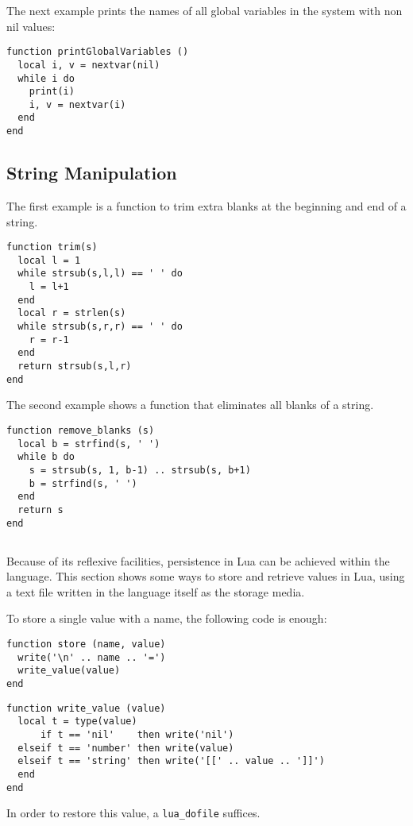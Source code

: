 The next example prints the names of all global variables
in the system with non nil values:
\begin{verbatim}
function printGlobalVariables ()
  local i, v = nextvar(nil)
  while i do
    print(i)
    i, v = nextvar(i)
  end
end
\end{verbatim}


\subsection{String Manipulation} \label{exstring}

The first example is a function to trim extra blanks at the beginning
and end of a string.
\begin{verbatim}
function trim(s)
  local l = 1
  while strsub(s,l,l) == ' ' do
    l = l+1
  end
  local r = strlen(s)
  while strsub(s,r,r) == ' ' do
    r = r-1
  end
  return strsub(s,l,r)
end
\end{verbatim}

The second example shows a function that eliminates all blanks
of a string.
\begin{verbatim}
function remove_blanks (s)
  local b = strfind(s, ' ')
  while b do
    s = strsub(s, 1, b-1) .. strsub(s, b+1)
    b = strfind(s, ' ')
  end
  return s
end
\end{verbatim}


\subsection{}
Because of its reflexive facilities,
persistence in Lua can be achieved within the language.
This section shows some ways to store and retrieve values in Lua,
using a text file written in the language itself as the storage media.

To store a single value with a name,
the following code is enough:
\begin{verbatim}
function store (name, value)
  write('\n' .. name .. '=')
  write_value(value)
end
\end{verbatim}
\begin{verbatim}
function write_value (value)
  local t = type(value)
      if t == 'nil'    then write('nil')
  elseif t == 'number' then write(value)
  elseif t == 'string' then write('[[' .. value .. ']]')
  end
end
\end{verbatim}
In order to restore this value, a \verb'lua_dofile' suffices.

